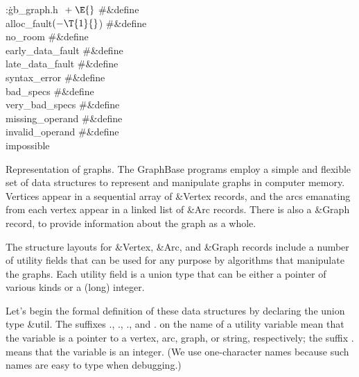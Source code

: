 \Y\B\4:\.{gb\_graph.h }\X${}\mathrel+\E{}$\6
\8\#\&{define} \\{alloc\_fault}\5${}({-}\T{1}{}$)\6
\8\#\&{define} \\{no\_room}\5\6
\8\#\&{define} \\{early\_data\_fault}\5\6
\8\#\&{define} \\{late\_data\_fault}\5\6
\8\#\&{define} \\{syntax\_error}\5\6
\8\#\&{define} \\{bad\_specs}\5\6
\8\#\&{define} \\{very\_bad\_specs}\5\6
\8\#\&{define} \\{missing\_operand}\5\6
\8\#\&{define} \\{invalid\_operand}\5\6
\8\#\&{define} \\{impossible}\5\par
\fi

Representation of graphs. The GraphBase programs employ a simple
and flexible set of data structures to represent and manipulate graphs
in computer memory.  Vertices appear in a sequential array of
\&{Vertex} records, and the arcs emanating from each vertex appear in
a linked list of \&{Arc} records. There is also a \&{Graph} record, to
provide information about the graph as a whole.

The structure layouts for \&{Vertex}, \&{Arc}, and \&{Graph} records
include a number of utility fields that can be used for any purpose by
algorithms that manipulate the graphs. Each utility field is a union
type that can be either a pointer of various kinds or a (long) integer.

Let's begin the formal definition of these data structures by declaring the
union type \&{util}. The suffixes ., ., ., and . on the name
of a utility variable mean that the variable is a pointer to a vertex, arc,
graph, or string, respectively; the suffix . means that the variable is
an integer. (We use one-character names because such names are easy to type
when debugging.)

